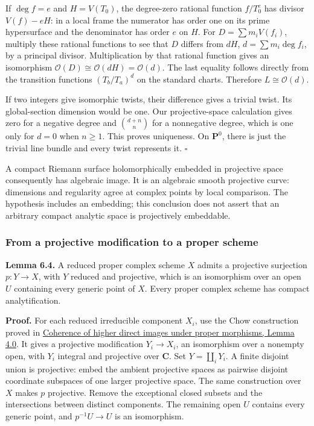 \documentclass[11pt]{article}
\begin{document}
If \(\deg f=e\) and \(H=V(T_0)\), the degree-zero rational function
\(f/T_0^e\) has divisor \(V(f)-eH\): in a local frame the numerator has
order one on its prime hypersurface and the denominator has order \(e\)
on \(H\). For \(D=\sum m_iV(f_i)\), multiply these rational functions to
see that \(D\) differs from \(dH\), \(d=\sum m_i\deg f_i\), by a
principal divisor. Multiplication by that rational function gives an
isomorphism \(\mathcal O(D)\cong\mathcal O(dH)=\mathcal O(d)\). The last
equality follows directly from the transition functions \((T_b/T_a)^d\)
on the standard charts. Therefore \(L\cong\mathcal O(d)\).

If two integers give isomorphic twists, their difference gives a trivial
twist. Its global-section dimension would be one. Our projective-space
calculation gives zero for a negative degree and \(\binom{d+n}{n}\) for
a nonnegative degree, which is one only for \(d=0\) when \(n\geq1\).
This proves uniqueness. On \(\mathbf P^0\), there is just the trivial
line bundle and every twist represents it. \(\square\)

A compact Riemann surface holomorphically embedded in projective space
consequently has algebraic image. It is an algebraic smooth projective
curve: dimensions and regularity agree at complex points by local
comparison. The hypothesis includes an embedding; this conclusion does
not assert that an arbitrary compact analytic space is projectively
embeddable.

\subsubsection{From a projective modification to a proper
scheme}\label{from-a-projective-modification-to-a-proper-scheme}

\textbf{Lemma 6.4.} A reduced proper complex scheme \(X\) admits a
projective surjection \(p:Y\to X\), with \(Y\) reduced and projective,
which is an isomorphism over an open \(U\) containing every generic
point of \(X\). Every proper complex scheme has compact analytification.

\textbf{Proof.} For each reduced irreducible component \(X_i\), use the
Chow construction proved in
\href{proper-morphisms-and-coherent-direct-images.html\#4-a-projective-modification-supplies-the-witness}{Coherence
of higher direct images under proper morphisms, Lemma 4.0}. It gives a
projective modification \(Y_i\to X_i\), an isomorphism over a nonempty
open, with \(Y_i\) integral and projective over \(\mathbf C\). Set
\(Y=\coprod_iY_i\). A finite disjoint union is projective: embed the
ambient projective spaces as pairwise disjoint coordinate subspaces of
one larger projective space. The same construction over \(X\) makes
\(p\) projective. Remove the exceptional closed subsets and the
intersections between distinct components. The remaining open \(U\)
contains every generic point, and \(p^{-1}U\to U\) is an isomorphism.
\end{document}
